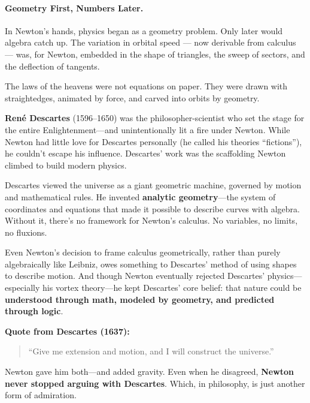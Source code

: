 \paragraph{Geometry First, Numbers Later.}  
In Newton’s hands, physics began as a geometry problem. Only later would algebra catch up. The variation in orbital speed — now derivable from calculus — was, for Newton, embedded in the shape of triangles, the sweep of sectors, and the deflection of tangents.

The laws of the heavens were not equations on paper.  
They were drawn with straightedges, animated by force, and carved into orbits by geometry.



\begin{tcolorbox}[colback=blue!5!white, colframe=blue!50!black, 
  title={Historical Sidebar: Descartes—The Philosopher Newton Couldn't Ignore}]
  
      \textbf{René Descartes} (1596–1650) was the philosopher-scientist who set the stage for the entire Enlightenment—and unintentionally lit a fire under Newton. While Newton had little love for Descartes personally (he called his theories “fictions”), he couldn’t escape his influence. Descartes’ work was the scaffolding Newton climbed to build modern physics.
  
      \medskip
  
      Descartes viewed the universe as a giant geometric machine, governed by motion and mathematical rules. He invented \textbf{analytic geometry}—the system of coordinates and equations that made it possible to describe curves with algebra. Without it, there’s no framework for Newton’s calculus. No variables, no limits, no fluxions.
  
      \medskip
  
      Even Newton’s decision to frame calculus geometrically, rather than purely algebraically like Leibniz, owes something to Descartes’ method of using shapes to describe motion. And though Newton eventually rejected Descartes’ physics—especially his vortex theory—he kept Descartes’ core belief: that nature could be \textbf{understood through math, modeled by geometry, and predicted through logic}.
  
      \medskip
  
      \textbf{Quote from Descartes (1637):}
      \begin{quote}
      “Give me extension and motion, and I will construct the universe.”
      \end{quote}
  
      Newton gave him both—and added gravity. Even when he disagreed, \textbf{Newton never stopped arguing with Descartes}. Which, in philosophy, is just another form of admiration.
  
\end{tcolorbox}













